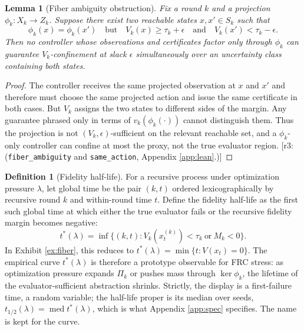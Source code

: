 \documentclass[11pt]{article}
\newtheorem{lemma}{Lemma}[section]
\theoremstyle{definition}
\newtheorem{definition}{Definition}[section]
\theoremstyle{remark}
\newcommand{\revnote}[1]{\textcolor{red!60!black}{[r3: #1]}}
\begin{document}
\begin{lemma}[Fiber ambiguity obstruction]\label{lem:fiber}
Fix a round $k$ and a projection $\phi_k:X_k\to Z_k$. Suppose there exist two reachable states $x,x'\in S_k$ such that
\begin{equation}
\phi_k(x)=\phi_k(x')\quad\text{but}\quad V_k(x)\ge\tau_k+\epsilon\quad\text{and}\quad V_k(x')<\tau_k-\epsilon. \label{eq:collide}
\end{equation}
Then no controller whose observations and certificates factor only through $\phi_k$ can guarantee $V_k$-confinement at slack $\epsilon$ simultaneously over an uncertainty class containing both states.
\end{lemma}
\begin{proof}
The controller receives the same projected observation at $x$ and $x'$ and therefore must choose the same projected action and issue the same certificate in both cases. But $V_k$ assigns the two states to different sides of the margin. Any guarantee phrased only in terms of $v_k(\phi_k(\cdot))$ cannot distinguish them. Thus the projection is not $(V_k,\epsilon)$-sufficient on the relevant reachable set, and a $\phi_k$-only controller can confine at most the proxy, not the true evaluator region. \revnote{(\texttt{fiber\_ambiguity} and \texttt{same\_action}, Appendix \ref{app:lean}.)}
\end{proof}

\begin{definition}[Fidelity half-life]\label{def:halflife}
For a recursive process under optimization pressure $\lambda$, let global time be the pair $(k,t)$ ordered lexicographically by recursive round $k$ and within-round time $t$. Define the fidelity half-life as the first such global time at which either the true evaluator fails or the recursive fidelity margin becomes negative:
\begin{equation}
t^*(\lambda)=\inf\{(k,t): V_k(x^{(k)}_t)<\tau_k\ \text{or}\ M_k<0\}.
\end{equation}
In Exhibit \ref{ex:fiber}, this reduces to $t^*(\lambda)=\min\{t:V(x_t)=0\}$. The empirical curve $t^*(\lambda)$ is therefore a prototype observable for FRC stress: as optimization pressure expands $\Pi_k$ or pushes mass through $\ker\phi_k$, the lifetime of the evaluator-sufficient abstraction shrinks. Strictly, the display is a first-failure time, a random variable; the half-life proper is its median over seeds, $t_{1/2}(\lambda)=\operatorname{med}t^*(\lambda)$, which is what Appendix \ref{app:spec} specifies. The name is kept for the curve.
\end{definition}
\end{document}
